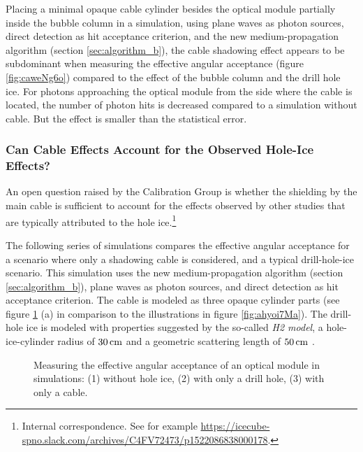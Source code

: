 Placing a minimal opaque cable cylinder besides the optical module
partially inside the bubble column in a simulation, using plane waves as
photon sources, direct detection as hit acceptance criterion, and the
new medium-propagation algorithm (section \ref{sec:algorithm_b}), the
cable shadowing effect appears to be subdominant when measuring the
effective angular acceptance (figure \ref{fig:caweNg6o}) compared to the
effect of the bubble column and the drill hole ice. For photons
approaching the optical module from the side where the cable is located,
the number of photon hits is decreased compared to a simulation without
cable. But the effect is smaller than the statistical error.


\subsubsection{Can Cable Effects Account for the Observed Hole-Ice Effects?}

An open question raised by the \icecube Calibration Group is whether the
shielding by the main cable is sufficient to account for the effects
observed by other studies that are typically attributed to the hole
ice.\footnote{Internal correspondence. See for example \url{https://icecube-spno.slack.com/archives/C4FV72473/p1522086838000178}.}

The following series of simulations compares the effective angular
acceptance for a scenario where only a shadowing cable is considered,
and a typical drill-hole-ice scenario. This simulation uses the new
medium-propagation algorithm (section \ref{sec:algorithm_b}), plane
waves as photon sources, and direct detection as hit acceptance
criterion. The cable is modeled as three opaque cylinder parts (see
figure \ref{fig:Ohw1aibu} (a) in comparison to the illustrations in
figure \ref{fig:ahyoi7Ma}). The drill-hole ice is modeled with
properties suggested by the so-called \textit{H2 model}, a
hole-ice-cylinder radius of \(30\text{\,cm}\) and a geometric scattering length
of \(50\text{\,cm}\) \cite{holeicestudieswithyag}.


\begin{figure}[htbp]
  \hfill
  \hfill
  \caption{Measuring the effective angular acceptance of an optical module in simulations: (1) without hole ice, (2) with only a drill hole, (3) with only a cable.}
  \label{fig:Ohw1aibu}
\end{figure}

